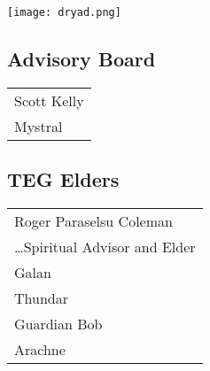 \documentclass[9pt,twoside,openright,final,article,letterpaper]{memoir}
\let\oldsubsection=\subsection
\renewcommand{\subsection}[1]{%
  \vspace{6pt}
  \needspace{1.25in}
  \oldsubsection{#1}
  \nopagebreak}
\begin{document}
\begin{multicols}{2}
  \begin{center}
    \texttt{[image: dryad.png]}
  \end{center}

  \subsection{Advisory Board}
  \begin{center}
    \begin{tabular}{l}
      Scott Kelly \\
      Mystral \hspace{2in}
    \end{tabular}
  \end{center}

  \subsection{TEG Elders}
  \begin{center}
    \begin{tabular}{l}
      Roger Paraselsu Coleman \\
      { \hspace{1in} \ldots \small Spiritual Advisor and Elder } \\
      Galan \\
      Thundar \\
      Guardian Bob \\
      Arachne \\
    \end{tabular}
  \end{center}


\end{multicols}
\end{document}
